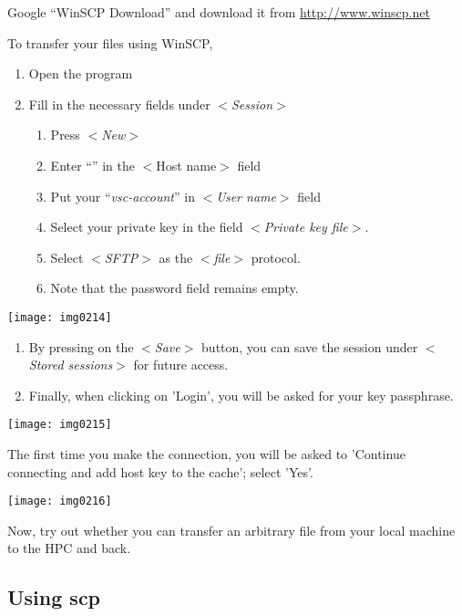 Google ``WinSCP Download'' and download it from \url{http://www.winscp.net}

To transfer your files using WinSCP,

\begin{enumerate}
\item  Open the program
\item  Fill in the necessary fields under $<$\emph{Session}$>$
\begin{enumerate}
\item  Press $<$\emph{New}$>$
\item  Enter ``\emph{\loginnode}'' in the $<$Host name$>$ field
\item  Put your ``\emph{vsc-account}'' in $<$\emph{User name}$>$ field
\item  Select your private key in the field $<$\emph{Private key file}$>$.
\item  Select $<$\emph{SFTP}$>$ as the $<$\emph{file}$>$ protocol.
\item  Note that the password field remains empty.
\end{enumerate}
\end{enumerate}

\texttt{[image: img0214]}

\begin{enumerate}
\item  By pressing on the $<$\emph{Save}$>$ button, you can save the session under $<$\emph{Stored sessions}$>$ for future access.
\item  Finally, when clicking on 'Login', you will be asked for your key passphrase.
\end{enumerate}

\texttt{[image: img0215]}

The first time you make the connection, you will be asked to 'Continue
connecting and add host key to the cache'; select 'Yes'.

\texttt{[image: img0216]}

Now, try out whether you can transfer an arbitrary file from your local machine to the HPC and back.

\fi
\ifmac

\subsection{Using scp}

